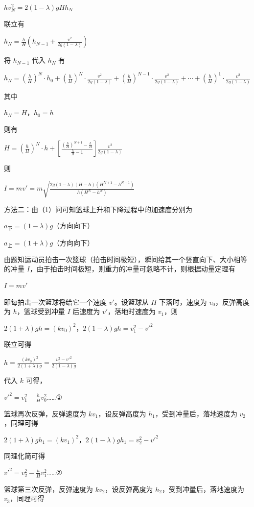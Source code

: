 \documentclass[\gkver]{gaokaozhenti}
\begin{document}
\begin{enumerate}
{$hv_{N}^{2} = 2(1 - \lambda)gHh_{N}$

联立有

$h_{N} = \frac{h}{H}(h_{N-1} + \frac{v^{2}}{2g(1 - \lambda)})$

将 $h_{N-1}$ 代入 $h_{N}$ 有

$h_{N} = (\frac{h}{H})^{N}\cdot h_{0} + (\frac{h}{H})^{N}\cdot\frac{v^{2}}{2g(1 - \lambda)} + (\frac{h}{H})^{N-1}\cdot\frac{v^{2}}{2g(1 - \lambda)} + \cdots + (\frac{h}{H})^{1}\cdot\frac{v^{2}}{2g(1 - \lambda)}$

其中

$h_{N} = H$，$h_{0} = h$

则有

$H = (\frac{h}{H})^{N}\cdot h + [\frac{(\frac{h}{H})^{N+1} - \frac{h}{H}}{\frac{h}{H} - 1}]\frac{v^{2}}{2g(1 - \lambda)}$

则

$I = mv' = m\sqrt{\frac{2g(1 - \lambda)(H - h)(H^{N+1} - h^{N+1})}{h(H^{N} - h^{N})}}$

方法二：由（1）问可知篮球上升和下降过程中的加速度分别为

$a_{\text{下}} = (1 - \lambda)g$（方向向下）

$a_{\text{上}} = (1 + \lambda)g$（方向向下）

由题知运动员拍击一次篮球（拍击时间极短），瞬间给其一个竖直向下、大小相等的冲量 $I$，由于拍击时间极短，则重力的冲量可忽略不计，则根据动量定理有

$I = mv'$

即每拍击一次篮球将给它一个速度 $v'$。设篮球从 $H$ 下落时，速度为 $v_{0}$，反弹高度为 $h$，篮球受到冲量 $I$ 后速度为 $v'$，落地时速度为 $v_{1}$，则

$2(1 + \lambda)gh = (kv_{0})^{2}$，$2(1 - \lambda)gh = v_{1}^{2} - v'^{2}$

联立可得

$h = \frac{(kv_{0})^{2}}{2(1 + \lambda)g} = \frac{v_{1}^{2} - v'^{2}}{2(1 - \lambda)g}$

代入 $k$ 可得，

$v'^{2} = v_{1}^{2} - \frac{h}{H}v_{0}^{2}$……①

篮球再次反弹，反弹速度为 $kv_{1}$，设反弹高度为 $h_{1}$，受到冲量后，落地速度为 $v_{2}$，同理可得

$2(1 + \lambda)gh_{1} = (kv_{1})^{2}$，$2(1 - \lambda)gh_{1} = v_{2}^{2} - v'^{2}$

同理化简可得

$v'^{2} = v_{2}^{2} - \frac{h}{H}v_{1}^{2}$……②

篮球第三次反弹，反弹速度为 $kv_{2}$，设反弹高度为 $h_{2}$，受到冲量后，落地速度为 $v_{3}$，同理可得

}
\end{enumerate}
\end{document}
